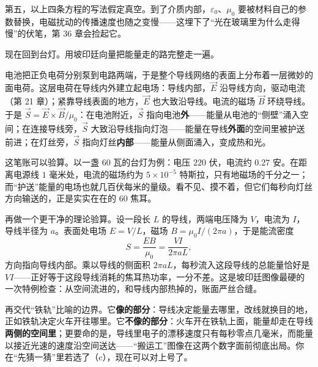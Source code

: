 第五，以上四条方程的写法假定真空。到了介质内部，\(\varepsilon_0\)、\(\mu_0\) 要被材料自己的参数替换，电磁扰动的传播速度也随之变慢——这埋下了“光在玻璃里为什么走得慢”的伏笔，第 36 章会捡起它。


现在回到台灯。用坡印廷向量把能量走的路完整走一遍。

电池把正负电荷分别泵到电路两端，于是整个导线网络的表面上分布着一层微妙的面电荷。这层电荷在导线内外建立起电场：导线内部，\(\vec E\) 沿导线方向，驱动电流（第 21 章）；紧靠导线表面的地方，\(\vec E\) 也大致沿导线。电流的磁场 \(\vec B\) 环绕导线。于是 \(\vec S=\vec E\times\vec B/\mu_0\)：在电池附近，\(\vec S\) 指向电池\textbf{外}——能量从电池的“侧壁”涌入空间；在连接导线旁，\(\vec S\) 大致沿导线指向灯泡——能量在导线\textbf{外面}的空间里被护送前进；在灯丝旁，\(\vec S\) 指向灯丝\textbf{内部}——能量从侧面涌入，变成热和光。

\begin{center}
\end{center}

这笔账可以验算。以一盏 \(60\) 瓦的台灯为例：电压 \(220\) 伏，电流约 \(0.27\) 安。在距离电源线 \(1\) 毫米处，电流的磁场约为 \(5\times10^{-5}\) 特斯拉，只有地磁场的千分之一；而“护送”能量的电场也就几百伏每米的量级。看不见、摸不着，但它们每秒向灯丝方向输送的，正是实实在在的 \(60\) 焦耳。

再做一个更干净的理论验算。设一段长 \(L\) 的导线，两端电压降为 \(V\)，电流为 \(I\)，导线半径为 \(a\)。表面处电场 \(E=V/L\)，磁场 \(B=\mu_0 I/(2\pi a)\)，于是能流密度
\[
S=\frac{EB}{\mu_0}=\frac{VI}{2\pi aL},
\]
方向指向导线内部。乘以导线的侧面积 \(2\pi aL\)，每秒流入这段导线的总能量恰好是 \(VI\)——正好等于这段导线消耗的焦耳热功率，一分不差。这是坡印廷图像最硬的一次特例检查：从空间流进的，和导线内部热掉的，账面严丝合缝。

再交代“铁轨”比喻的边界。它\textbf{像的部分}：导线决定能量去哪里，改线就换目的地，正如铁轨决定火车开往哪里。它\textbf{不像的部分}：火车开在铁轨上面，能量却走在导线\textbf{两侧的空间里}；更要命的是，导线里电子的漂移速度只有每秒零点几毫米，而能量以接近光速的速度沿空间送达——“搬运工”图像在这两个数字面前彻底出局。你在“先猜一猜”里若选了（c），现在可以对上号了。

